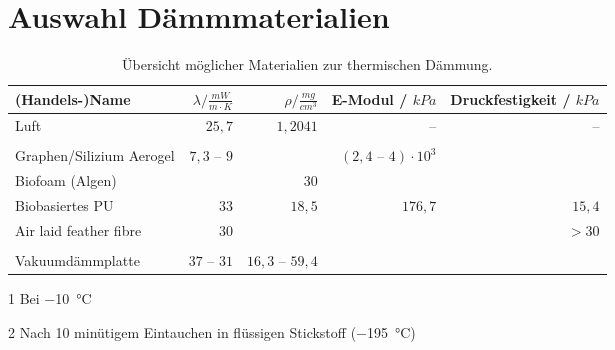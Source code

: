 	\section{Auswahl Dämmmaterialien}
		\begin{table}[h]
			\centering
			\caption{Übersicht möglicher Materialien zur thermischen Dämmung.}
			\begin{threeparttable}
				\begin{tabular}{@{}lrrrr@{}}
					\toprule
					(Handels-)Name																& \(\lambda / \frac{mW}{m \cdot K}\)	& \(\rho / \frac{mg}{cm^3}\)	& E-Modul / \(kPa\) 				& Druckfestigkeit / \(kPa\) \\
					\midrule
					Luft 																		&\(25,7\)						&\(1,2041\)						&--									&-- \\
					&&&&\\
					Graphen/Silizium Aerogel \cite{silica.graphene.aerogel.Lei.2017} 			& \(7,3 \text{ -- } 9\)			&								&\((2,4 \text{ -- } 4)\cdot 10^3\)	&\\
					Biofoam (Algen) \cite{Biofoam2.Morrison.1994}								&								&30								&									&\\
					Biobasiertes PU \cite{Biobased.PU.HuangX.QiJ.DeHoopC.XieJ.andChenY.2017}	&\(33\)							&\(18,5\)						&\(176,7\)							&\(15,4\)\\
					Air laid feather fibre \cite{air.laid.feather.fibre.Zhao.2020} 				& \(30\)\tnote{1} 		&								&									&\(> 30\)\tnote{2}\\
					&&&&\\
					Vakuumdämmplatte \cite{Vakuumplate.Nagarajan.2013}							&\(37 \text{ -- } 31\)			&\(16,3 \text{ -- } 59,4\)		&									&\\
					\bottomrule
				\end{tabular}
				\begin{tablenotes}
					\footnotesize
					\item[1] Bei \SI{-10}{\celsius}
					\item[2] Nach 10 minütigem Eintauchen in flüssigen Stickstoff (\SI{-195}{\celsius})
				\end{tablenotes}
			\end{threeparttable}
		\end{table}
